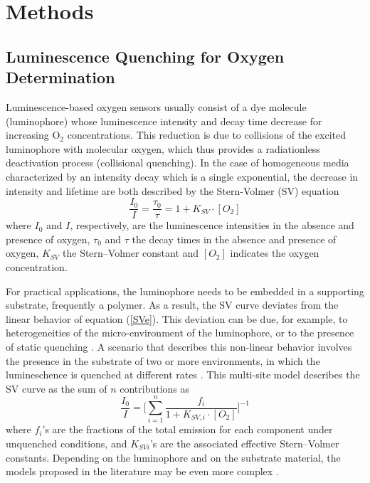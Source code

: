 \documentclass[9pt,twocolumn,twoside,pdftex]{optica}
\begin{document}
\section{Methods}
\label{sec:methods}

\subsection{Luminescence Quenching for Oxygen Determination}
\label{Theory}

Luminescence-based oxygen sensors usually consist of a dye molecule (luminophore) whose luminescence intensity and decay time decrease for increasing O$_2$ concentrations. This reduction is due to collisions of the excited luminophore with molecular oxygen, which thus provides a radiationless deactivation process (collisional quenching). 
In the case of homogeneous media characterized by an intensity decay which is a single exponential, the decrease in intensity and lifetime are both described by the Stern-Volmer (SV) equation \cite{Lakowicz2006}
\begin{equation}
\frac{I_0}{I}=\frac{\tau_0}{\tau}=1+K_{SV} \cdot \left[O_2\right]
\label{SVe}
\end{equation}
where $I_0$ and $I$, respectively, are the luminescence intensities in the absence and presence of oxygen, $\tau_0$ and $\tau$ the decay times in the absence and presence of oxygen, $K_{SV}$ the Stern–Volmer constant and $\left[O_2\right]$ indicates the oxygen concentration.

For practical applications, the luminophore needs to be embedded in a supporting substrate, frequently a polymer. As a result, the SV curve deviates from the linear behavior of equation (\ref{SVe}). This deviation can be due, for example, to heterogeneities of the micro-environment of the luminophore, or to the presence of static quenching \cite{Wang2014}. A scenario that describes this non-linear behavior involves the presence in the substrate of two or more environments, in which the lumineschence is quenched at different rates \cite{Carraway1991,Demas1995}. This multi-site model describes the SV curve as the sum of $n$ contributions as
\begin{equation}
\frac{I_0}{I}=\bigg[ \sum_{i=1}^n
\frac{f_i}{1+K_{SV,i} \cdot \left[O_2\right]}
\bigg]^{-1}
\label{SVe2}
\end{equation}
where $f_i$'s are the fractions of the total emission for each component under unquenched conditions, and $K_{SVi}$'s are the associated effective Stern–Volmer constants. Depending on the luminophore and on the substrate material, the models proposed in the literature may be even more complex \cite{Demas1995,Hartmann1995,Mills1999}.
\end{document}
